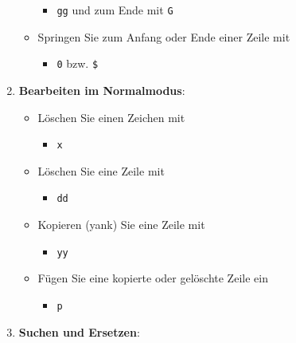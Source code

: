\documentclass{vorlage-design-main}
\begin{document}
\begin{enumerate}
\begin{itemize}
    \begin{itemize}
    
    \item
      \verb|gg| und zum Ende mit
      \verb|G|
    \end{itemize}
  \item
    Springen Sie zum Anfang oder Ende einer Zeile mit

    \begin{itemize}
    
    \item
      \verb|0| bzw. \verb|$|
    \end{itemize}
  \end{itemize}
\item
  \textbf{Bearbeiten im Normalmodus}:

  \begin{itemize}
  
  \item
    Löschen Sie einen Zeichen mit

    \begin{itemize}
    
    \item
      \verb|x|
    \end{itemize}
  \item
    Löschen Sie eine Zeile mit

    \begin{itemize}
    
    \item
      \verb|dd|
    \end{itemize}
  \item
    Kopieren (yank) Sie eine Zeile mit

    \begin{itemize}
    
    \item
      \verb|yy|
    \end{itemize}
  \item
    Fügen Sie eine kopierte oder gelöschte Zeile ein

    \begin{itemize}
    
    \item
      \verb|p|
    \end{itemize}
  \end{itemize}
\item
  \textbf{Suchen und Ersetzen}:

  \begin{itemize}
  

\end{itemize}
\end{enumerate}
\end{document}
